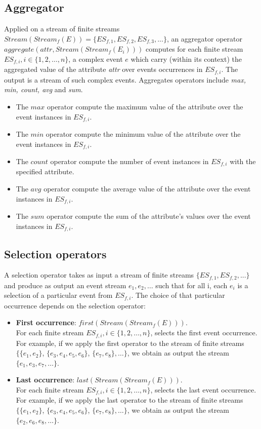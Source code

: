 \subsection{Aggregator}
Applied on a stream of finite streams $Stream(Stream_f(E))= \{ES_{f,1}, ES_{f,2}, ES_{f,3}, ...\}$, an aggregator operator $aggregate(attr, Stream(Stream_f(E_i)))$ computes for each finite stream $ES_{f,i}, i \in \{1, 2, …, n\}$, a complex event $e$ which carry (within its context) the aggregated value of the attribute \textit{attr} over events occurrences in $ES_{f,i}$. The output is a stream of such complex events. Aggregates operators include \textit{max, min, count, avg} and \textit{sum}. 
\begin{itemize}
 \item The $max$ operator compute the maximum value of the attribute over the event instances in $ES_{f,i}$.
 \item The $min$ operator compute the minimum value of the attribute over the event instances in $ES_{f,i}$.
 \item The $count$ operator compute the number of event instances in $ES_{f,i}$ with the specified attribute.
 \item The $avg$ operator compute the average value of the attribute over the event instances in $ES_{f,i}$.
 \item The $sum$ operator compute the sum of the attribute's values over the event instances in $ES_{f,i}$.
\end{itemize}

\subsection{Selection operators}
A selection operator takes as input a stream of finite streams $\{ES_{f,1}, ES_{f,2},...\}$ and produce as output an event stream ${e_1, e_2, … }$ such that for all i, each $e_i$ is a selection of a particular event from $ES_{f,i}$. The choice of that particular occurrence depends on the selection operator: %
\begin{itemize}
 \item \textbf{ First occurrence}: $first (Stream(Stream_f(E)))$. \\
For each finite stream $ES_{f,i}, i \in \{1, 2, …, n\}$, selects the first event occurrence. For example, if we apply the first operator to the stream of finite streams $\{\{e_1, e_2\}$, $\{ e_3, e_4, e_5, e_6\}$, $\{ e_7, e_8\},…\}$, we obtain as output the stream $\{e_1, e_3, e_7, …\}$.
   \item \textbf{Last occurrence}: $last (Stream(Stream_f(E)))$. \\
For each finite stream $ES_{f,i}, i \in \{1, 2, …, n\}$, selects the last event occurrence. For example, if we apply the last operator to the stream of finite streams $\{\{e_1, e_2\}$, $\{ e_3, e_4, e_5, e_6\}$, $\{ e_7, e_8\},…\}$, we obtain as output the stream $\{e_2, e_6, e_8, …\}$.
\end{itemize}
